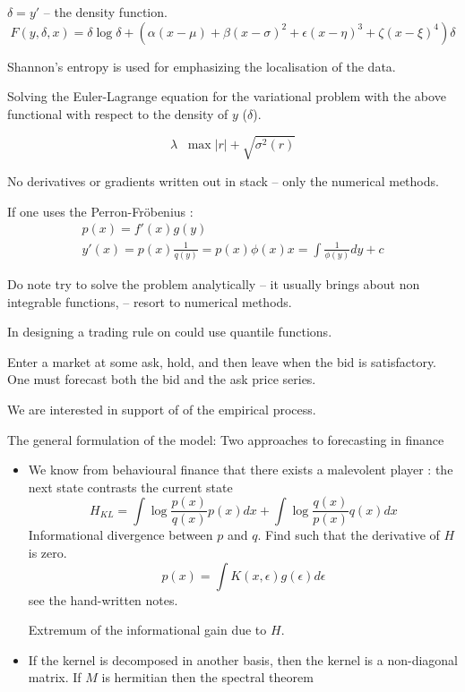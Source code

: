 \documentclass[a4paper]{article}
\newcommand{\brac}[1]{{\left ( #1 \right )}}
\newcommand{\abs}[1]{{\left | #1 \right |}}
\newcommand{\defn}{\mathop{\overset{\Delta}{=}}\nolimits}
\begin{document}
$\delta = y'$ -- the density function.
\[F(y,\delta, x) = \delta \log \delta + \brac{\alpha \brac{x-\mu} + \beta \brac{x-\sigma}^2 + \epsilon \brac{x-\eta}^3 + \zeta \brac{x-\xi}^4} \delta \]

Shannon's entropy is used for emphasizing the localisation of the data.

Solving the Euler-Lagrange equation for the variational problem with the above functional with respect to the density of $y$ ($\delta$).

\[\lambda \defn \max\abs{r} + \sqrt{\sigma^2(r)}\]

No derivatives or gradients written out in stack -- only the numerical methods.


If one uses the Perron-Fr\"obenius :
\begin{align*}
	p(x) = f'(x) g(y)\\
	y'(x) = p(x) \frac{1}{q(y)} = p(x) \phi(x)
	x = \int \frac{1}{\phi(y)} dy + c
\end{align*}

Do note try to solve the problem analytically -- it usually brings about non integrable functions, -- resort to numerical methods.

In designing a trading rule on could use quantile functions.



Enter a market at some ask, hold, and then leave when the bid is satisfactory.
One must forecast both the bid and the ask price series.

We are interested in support of of the empirical process.


The general formulation of the model:
Two approaches to forecasting in finance
\begin{itemize}
	\item We know from behavioural finance that there exists a malevolent player : the next state contrasts the current state
	\[H_{KL} = \int \log\frac{p(x)}{q(x)} p(x) dx + \int \log\frac{q(x)}{p(x)} q(x) dx\]
	Informational divergence between $p$ and $q$. Find such that the derivative of $H$ is zero.
	\[p(x) = \int K(x,\epsilon) g(\epsilon) d\epsilon \]
	see the hand-written notes.

	Extremum of the informational gain due to $H$.

	\item If the kernel is decomposed in another basis, then the kernel is a non-diagonal matrix. If $M$ is hermitian then the spectral theorem 



\end{itemize}
\end{document}
